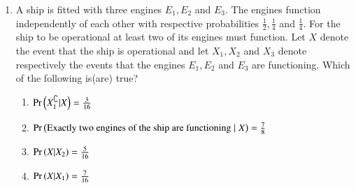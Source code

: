 \documentclass[journal,12pt,onecolumn,article]{IEEEtran}
\theoremstyle{remark}
\begin{document}
\begin{enumerate}[start=3]
\begin{enumerate}
\end{enumerate}
\item A ship is fitted with three engines $E_1,E_2$ and $E_3$. The engines function independently of each other with respective probabilities $\frac{1}{2},\frac{1}{4}$ and $\frac{1}{4}$. For the ship to be operational at least two of its engines must function. Let $X$ denote the event that the ship is operational and let $X_1,X_2$ and $X_3$ denote respectively the events that the engines $E_1,E_2$ and $E_3$ are functioning. Which of the following is(are) true?
\hfill{}
\begin{enumerate}
\item $\Pr\left(X_1^\complement|X\right)=\frac{3}{16}$
\item $\Pr\left(\text{Exactly two engines of the ship are functioning}\;|\; X\right)=\frac{7}{8}$
\item $\Pr\left(X|X_2\right)=\frac{5}{16}$
\item $\Pr\left(X|X_1\right)=\frac{7}{16}$
\end{enumerate}
\end{enumerate}
\end{document}
